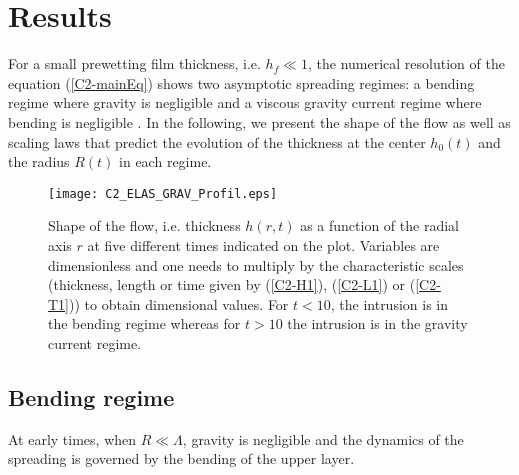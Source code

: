 \section{Results}
\label{C2-sec:regime-propagations}

For a small prewetting film thickness, i.e.  $h_f \ll 1$, the numerical
resolution  of the  equation  (\ref{C2-mainEq})  shows two  asymptotic
spreading regimes: a bending regime  where gravity is negligible and a
viscous   gravity  current   regime   where   bending  is   negligible
\citep{Michaut:2011kg,Bunger:2011cb,Lister:2013ia}. In  the following,
we present the shape of the flow  as well as scaling laws that predict
the evolution of  the thickness at the center $h_0(t)$  and the radius
$R(t)$ in each regime.

\begin{figure}[h!]
  \begin{center}
    \graphicspath{ {/Users/thorey/Documents/These/Manuscript/Figure/Chapter2/} }
    \texttt{[image: C2\_ELAS\_GRAV\_Profil.eps]}
    \caption{Shape of the flow, i.e.  thickness $h(r,t)$ as a function
      of the radial axis $r$ at  five different times indicated on the
      plot. Variables are  dimensionless and one needs  to multiply by
      the characteristic  scales (thickness,  length or time  given by
      (\ref{C2-H1}),   (\ref{C2-L1})  or   (\ref{C2-T1}))  to   obtain
      dimensional values.  For $t<10$, the intrusion is in the bending
      regime  whereas  for $t>10$  the  intrusion  is in  the  gravity
      current regime.}
    \label{C2_ELAS_GRAV_Profil}
  \end{center}
\end{figure}

\subsection{Bending regime}
\label{C2-sec:bending-regime}

At early times, when $R \ll \Lambda$, gravity is negligible and the
dynamics of  the spreading  is governed  by the  bending of  the upper
layer.

